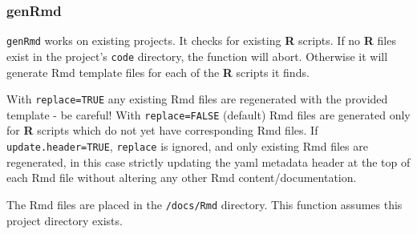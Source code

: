 \documentclass{article}\usepackage[]{graphicx}\usepackage[]{color}
\begin{document}
\subsubsection{genRmd}
\texttt{genRmd} works on existing projects. It checks for existing \textbf{R} scripts.
If no \textbf{R} files exist in the project's \texttt{code} directory, the function will abort.
Otherwise it will generate Rmd template files for each of the \textbf{R} scripts it finds.

With \texttt{replace=TRUE} any existing Rmd files are regenerated with the provided template - be careful!
With \texttt{replace=FALSE} (default) Rmd files are generated only for \textbf{R} scripts which do not yet have corresponding Rmd files.
If \texttt{update.header=TRUE}, \texttt{replace} is ignored, and only existing Rmd files are regenerated,
in this case strictly updating the yaml metadata header at the top of each Rmd file without altering any other Rmd content/documentation. 

The Rmd files are placed in the \texttt{/docs/Rmd} directory.
This function assumes this project directory exists.
\end{document}
